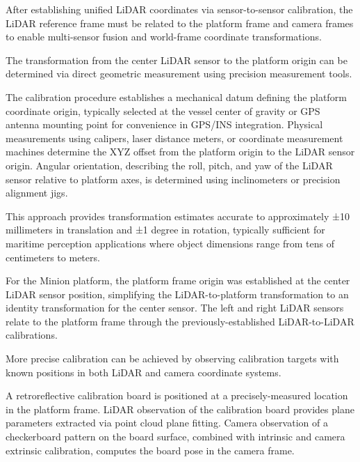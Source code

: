 
After establishing unified LiDAR coordinates via sensor-to-sensor calibration, the LiDAR reference frame must be related to the platform frame and camera frames to enable multi-sensor fusion and world-frame coordinate transformations.


The transformation from the center LiDAR sensor to the platform origin can be determined via direct geometric measurement using precision measurement tools.

The calibration procedure establishes a mechanical datum defining the platform coordinate origin, typically selected at the vessel center of gravity or GPS antenna mounting point for convenience in GPS/INS integration.
Physical measurements using calipers, laser distance meters, or coordinate measurement machines determine the XYZ offset from the platform origin to the LiDAR sensor origin.
Angular orientation, describing the roll, pitch, and yaw of the LiDAR sensor relative to platform axes, is determined using inclinometers or precision alignment jigs.

This approach provides transformation estimates accurate to approximately ±10 millimeters in translation and ±1 degree in rotation, typically sufficient for maritime perception applications where object dimensions range from tens of centimeters to meters.

For the Minion platform, the platform frame origin was established at the center LiDAR sensor position, simplifying the LiDAR-to-platform transformation to an identity transformation for the center sensor.
The left and right LiDAR sensors relate to the platform frame through the previously-established LiDAR-to-LiDAR calibrations.


More precise calibration can be achieved by observing calibration targets with known positions in both LiDAR and camera coordinate systems.

A retroreflective calibration board is positioned at a precisely-measured location in the platform frame.
LiDAR observation of the calibration board provides plane parameters extracted via point cloud plane fitting.
Camera observation of a checkerboard pattern on the board surface, combined with intrinsic and camera extrinsic calibration, computes the board pose in the camera frame.

